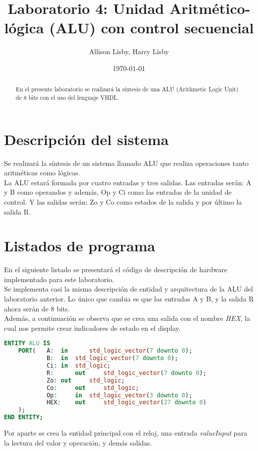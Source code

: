 \documentclass[12pt, letterpaper]{IEEEtran}
\title{Laboratorio 4: Unidad Aritmético-lógica (ALU) con
control secuencial}
\author{Allison Lisby, Harry Lisby}
\date{\today}
\begin{document}
\maketitle
\begin{abstract}
En el presente laboratorio se realizará la síntesis de una ALU (Arithmetic Logic Unit) de 8 bits con el uso del lenguaje VHDL.
\end{abstract}


\section{Descripción del sistema}
\indent Se realizará la síntesis de un sistema llamado ALU que realiza operaciones tanto aritméticas como lógicas.\\
\indent La ALU estará formada por cuatro entradas y tres salidas. Las entradas serán: A y B como operandos y además, Op y Ci como las entradas de la unidad de control. Y las salidas serán: Zo y Co como estados de la salida y por último la salida R.\\

\section{Listados de programa} 
\indent En el siguiente listado se presentará el código de descripción de hardware implementado para este laboratorio.\\
\indent Se implementa casi la misma descripción de entidad y arquitectura de la ALU del laboratorio anterior. Lo único que cambia es que las entradas A y B, y la salida R ahora serán de 8 bits.\\
\indent Además, a continuación se observa que se crea una salida con el nombre \textit{HEX}, la cual nos permite crear indicadores de estado en el display.\\

\begin{lstlisting}[language=VHDL]
ENTITY ALU IS
	PORT(	A: 	in	 	std_logic_vector(7 downto 0);
			B: 	in 	std_logic_vector(7 downto 0);
			Ci:	in 	std_logic;
			R:		out 	std_logic_vector(7 downto 0);
			Zo:	out 	std_logic;
			Co: 	out 	std_logic;
			Op:  	in 	std_logic_vector(3 downto 0);
			HEX:	out 	std_logic_vector(27 downto 0)
	);
END ENTITY;
\end{lstlisting}

\indent Por aparte se crea la entidad principal con el reloj, una entrada \textit{valueInput} para la lectura del valor y operación, y demás salidas. 
\end{document}

